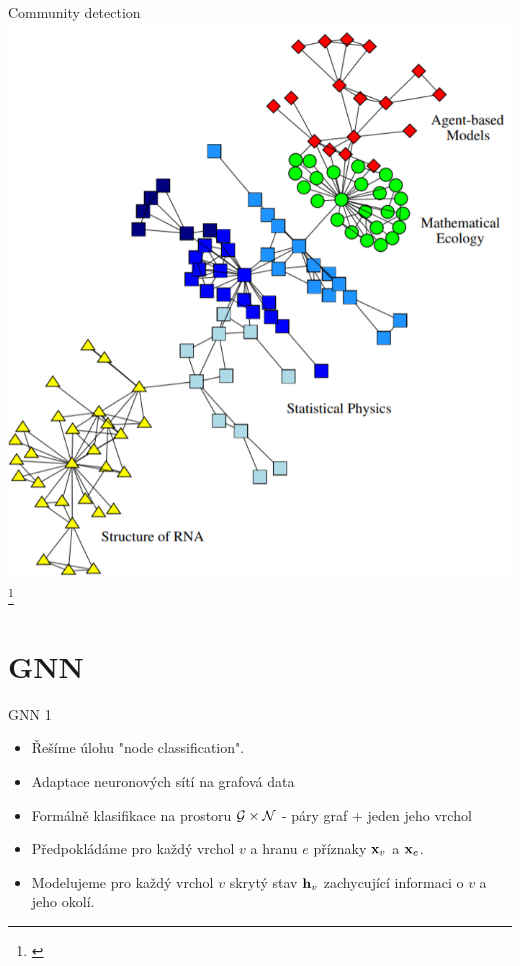 \documentclass[10pt]{beamer}
\newcommand{\mathvec}{\ensuremath{\mathbf}}
\newcommand{\mathspace}{\ensuremath{\mathcal}}
\begin{document}
\begin{frame}{Community detection}
	\centering
	\includegraphics[width=0.5\pagewidth]{images/community-detection.png}\footnote{\cite{girvan_community_2002}}
\end{frame}

\section{GNN}

\begin{frame}{GNN 1}
	\begin{itemize}
		\item Řešíme úlohu "node classification".
		\item Adaptace neuronových sítí na grafová data
		\item Formálně klasifikace na prostoru \( \mathspace{G} \times \mathspace{N} \) - páry graf + jeden jeho vrchol
		\item Předpokládáme pro každý vrchol \( v \) a hranu \( e \) příznaky \( \mathvec{x}_v \) a \( \mathvec{x}_e \).
		\item Modelujeme pro každý vrchol \( v \) skrytý stav \( \mathvec{h}_v \) zachycující informaci o \( v \) a jeho okolí.
	\end{itemize}
\end{frame}
\end{document}
